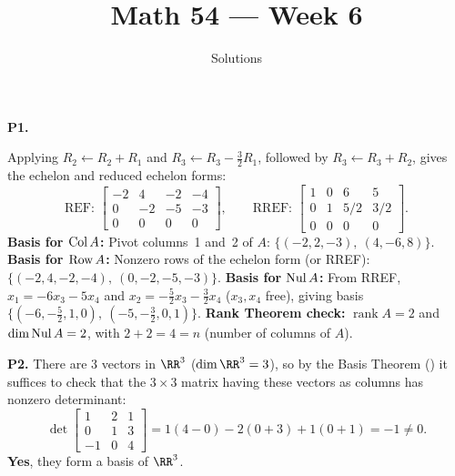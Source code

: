\documentclass[10pt]{scrartcl}
\title{Math 54 --- Week 6}
\subtitle{Solutions}
\author{}\date{}\ihead{}
\begin{document}
\maketitle

\begin{prob}\textbf{P1.}\par{}
\begin{steps}
  \ii Applying $R_2\leftarrow R_2+R_1$ and $R_3\leftarrow R_3-\tfrac32R_1$, followed by $R_3\leftarrow R_3+R_2$, gives the echelon and reduced echelon forms:
  \[
    \text{REF: }\begin{bmatrix} -2 & 4 & -2 & -4 \\ 0 & -2 & -5 & -3 \\ 0 & 0 & 0 & 0 \end{bmatrix},
    \qquad
    \text{RREF: }\begin{bmatrix} 1 & 0 & 6 & 5 \\ 0 & 1 & 5/2 & 3/2 \\ 0 & 0 & 0 & 0 \end{bmatrix}.
  \]
  \ii \textbf{Basis for $\operatorname{Col} A$:} Pivot columns~1 and~2 of $A$: $\big\{(-2,2,-3),\ (4,-6,8)\big\}$.
  \ii \textbf{Basis for $\operatorname{Row} A$:} Nonzero rows of the echelon form (or RREF): $\big\{(-2,4,-2,-4),\ (0,-2,-5,-3)\big\}$.
  \ii \textbf{Basis for $\operatorname{Nul} A$:} From RREF, $x_1=-6x_3-5x_4$ and $x_2=-\tfrac52x_3-\tfrac32x_4$ ($x_3,x_4$ free), giving basis $\big\{(-6,-\tfrac52,1,0),\ (-5,-\tfrac32,0,1)\big\}$.
  \ii \textbf{Rank Theorem check:} $\operatorname{rank}A=2$ and $\dim\operatorname{Nul} A=2$, with $2+2=4=n$ (number of columns of $A$).
\end{steps}
\end{prob}

\begin{prob}\textbf{P2.}
There are $3$ vectors in $\RR^3$ ($\dim\RR^3=3$), so by the Basis Theorem () it suffices to check that the $3\times 3$ matrix having these vectors as columns has nonzero determinant:
\[
  \det\begin{bmatrix} 1 & 2 & 1 \\ 0 & 1 & 3 \\ -1 & 0 & 4 \end{bmatrix} = 1(4-0) - 2(0+3) + 1(0+1) = -1 \ne 0.
\]
\textbf{Yes}, they form a basis of $\RR^3$.
\end{prob}
\end{document}
